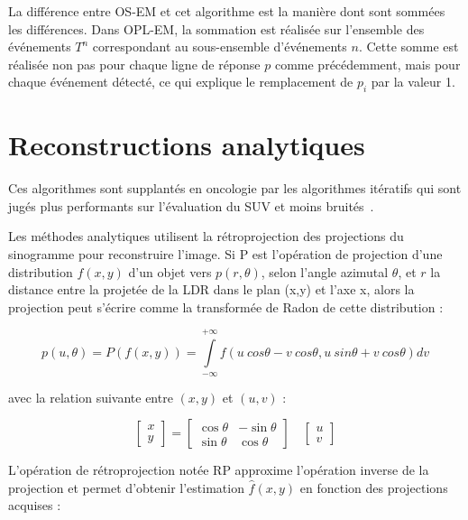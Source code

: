 La différence entre OS-EM et cet algorithme est la manière dont sont sommées les différences. Dans OPL-EM, la sommation est réalisée sur l'ensemble des événements $T^n$ correspondant au sous-ensemble d'événements $n$. Cette somme est réalisée non pas pour chaque ligne de réponse $p$ comme précédemment, mais pour chaque événement détecté, ce qui explique le remplacement de $p_i$ par la valeur 1.
		
	\section{Reconstructions analytiques}

Ces algorithmes sont supplantés en oncologie par les algorithmes itératifs qui sont jugés plus performants sur l'évaluation du SUV et moins bruités~\cite{schoder2004clinical}.

Les méthodes analytiques utilisent la rétroprojection des projections du sinogramme pour reconstruire l'image. Si P est l'opération de projection d’une distribution $f(x,y)$ d’un objet vers $p(r, \theta)$, selon l’angle azimutal $\theta$, et $r$ la distance entre la projetée de la LDR dans le plan (x,y) et l’axe x, alors la projection peut s’écrire comme la transformée de Radon de cette distribution :

\begin{equation}
p(u, \theta) = P(f(x,y)) = \int\limits_{-\infty}^{+\infty} f(u~cos \theta - v~cos \theta, u~sin \theta + v~cos \theta) dv
\end{equation}

avec la relation suivante entre $(x,y)$ et $(u,v)$ :

\begin{equation}
	\begin{bmatrix}
	x \\
	y
	\end{bmatrix}
	=	
	\begin{bmatrix}
	\cos \theta &  - \sin \theta \\
	\sin \theta & \cos \theta
	\end{bmatrix}
	\quad
	\begin{bmatrix}
	u \\
	v
	\end{bmatrix}
\end{equation}

L'opération de rétroprojection notée RP approxime l'opération inverse de la projection et permet d'obtenir l'estimation $\hat{f}(x,y)$ en fonction des projections acquises :

